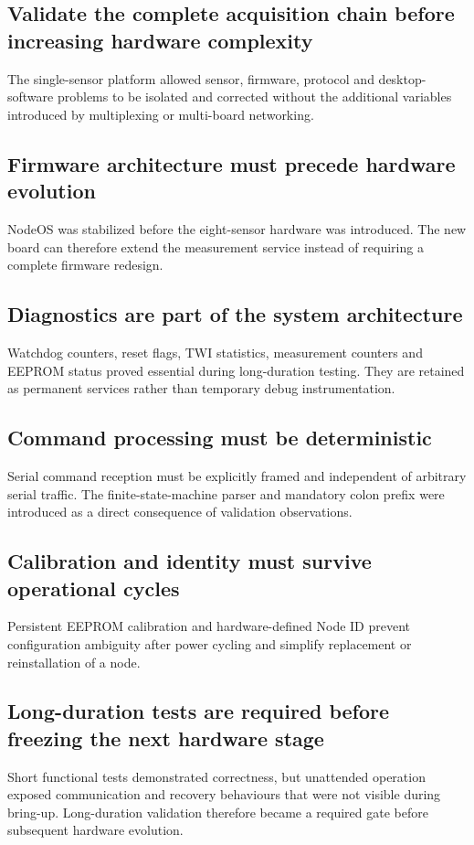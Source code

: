\subsection*{Validate the complete acquisition chain before increasing hardware complexity}
The single-sensor platform allowed sensor, firmware, protocol and desktop-software problems to be isolated and corrected without the additional variables introduced by multiplexing or multi-board networking.

\subsection*{Firmware architecture must precede hardware evolution}
NodeOS was stabilized before the eight-sensor hardware was introduced. The new board can therefore extend the measurement service instead of requiring a complete firmware redesign.

\subsection*{Diagnostics are part of the system architecture}
Watchdog counters, reset flags, TWI statistics, measurement counters and EEPROM status proved essential during long-duration testing. They are retained as permanent services rather than temporary debug instrumentation.

\subsection*{Command processing must be deterministic}
Serial command reception must be explicitly framed and independent of arbitrary serial traffic. The finite-state-machine parser and mandatory colon prefix were introduced as a direct consequence of validation observations.

\subsection*{Calibration and identity must survive operational cycles}
Persistent EEPROM calibration and hardware-defined Node ID prevent configuration ambiguity after power cycling and simplify replacement or reinstallation of a node.

\subsection*{Long-duration tests are required before freezing the next hardware stage}
Short functional tests demonstrated correctness, but unattended operation exposed communication and recovery behaviours that were not visible during bring-up. Long-duration validation therefore became a required gate before subsequent hardware evolution.

